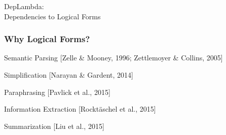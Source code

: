 \documentclass[mathserif,12pt]{beamer}
\begin{document}
\begin{frame}
\Large
\centering
\vspace{1.5em}
DepLambda: \\
 Dependencies to Logical Forms
\end{frame}

\begin{frame}
 \frametitle{Why Logical Forms?}
\large
Semantic Parsing {\scriptsize [Zelle \& Mooney, 1996; Zettlemoyer \& Collins, 2005]}
 
 \vspace{1em}
Simplification {\scriptsize [Narayan \& Gardent, 2014]}
 
 \vspace{1em}
Paraphrasing {\scriptsize [Pavlick et al., 2015]}
 
 \vspace{1em}
Information Extraction {\scriptsize [Rockt\"aschel et al., 2015]}
 
 \vspace{1em}
Summarization {\scriptsize [Liu et al., 2015]}
\end{frame}
\end{document}
